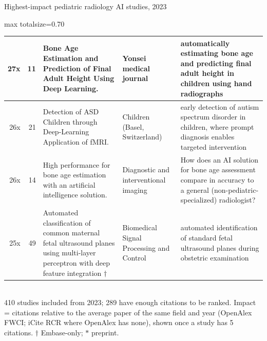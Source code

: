 \documentclass[aspectratio=169]{beamer}
\begin{document}
\begin{frame}[category=Journals/Preprints]{Highest-impact pediatric radiology AI studies, 2023}
\begin{adjustbox}{max totalsize={\textwidth}{0.70\textheight}}
\begin{tabular}{|r|r|>{\raggedright\arraybackslash}p{}|>{\raggedright\arraybackslash}p{}|>{\raggedright\arraybackslash}p{}|}
27x & 11 & Bone Age Estimation and Prediction of Final Adult Height Using Deep Learning. & Yonsei medical journal & automatically estimating bone age and predicting final adult height in children using hand radiographs \\ \hline
26x & 21 & Detection of ASD Children through Deep-Learning Application of fMRI. & Children (Basel, Switzerland) & early detection of autism spectrum disorder in children, where prompt diagnosis enables targeted intervention \\ \hline
26x & 14 & High performance for bone age estimation with an artificial intelligence solution. & Diagnostic and interventional imaging & How does an AI solution for bone age assessment compare in accuracy to a general (non-pediatric-specialized) radiologist? \\ \hline
25x & 49 & Automated classification of common maternal fetal ultrasound planes using multi-layer perceptron with deep feature integration $\dagger$ & Biomedical Signal Processing and Control & automated identification of standard fetal ultrasound planes during obstetric examination \\ \hline
\end{tabular}
\end{adjustbox}
\\[2pt]
{\tiny 410 studies included from 2023; 289 have enough citations to be ranked. Impact = citations relative to the average paper of the same field and year (OpenAlex FWCI; iCite RCR where OpenAlex has none), shown once a study has 5 citations. $\dagger$ Embase-only; $\ast$ preprint.}
\end{frame}
\end{document}
